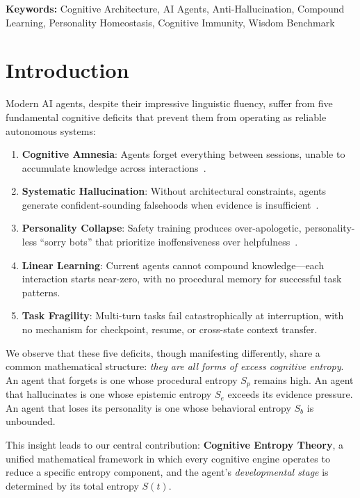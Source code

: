 \documentclass[11pt,a4paper]{article}
\begin{document}
\textbf{Keywords:} Cognitive Architecture, AI Agents, Anti-Hallucination,
Compound Learning, Personality Homeostasis, Cognitive Immunity, Wisdom Benchmark

\section{Introduction}

Modern AI agents, despite their impressive linguistic fluency, suffer from
five fundamental cognitive deficits that prevent them from operating as
reliable autonomous systems:

\begin{enumerate}[nosep]
  \item \textbf{Cognitive Amnesia}: Agents forget everything between sessions,
    unable to accumulate knowledge across interactions~\cite{mem0,letta}.
  \item \textbf{Systematic Hallucination}: Without architectural constraints,
    agents generate confident-sounding falsehoods when evidence is
    insufficient~\cite{truthfulqa}.
  \item \textbf{Personality Collapse}: Safety training produces
    over-apologetic, personality-less ``sorry bots'' that prioritize
    inoffensiveness over helpfulness~\cite{guardrails}.
  \item \textbf{Linear Learning}: Current agents cannot compound knowledge---each
    interaction starts near-zero, with no procedural memory for successful
    task patterns.
  \item \textbf{Task Fragility}: Multi-turn tasks fail catastrophically at
    interruption, with no mechanism for checkpoint, resume, or cross-state
    context transfer.
\end{enumerate}

We observe that these five deficits, though manifesting differently, share
a common mathematical structure: \emph{they are all forms of excess
cognitive entropy}. An agent that forgets is one whose procedural entropy
$S_p$ remains high. An agent that hallucinates is one whose epistemic
entropy $S_e$ exceeds its evidence pressure. An agent that loses its
personality is one whose behavioral entropy $S_b$ is unbounded.

This insight leads to our central contribution: \textbf{Cognitive Entropy
Theory}, a unified mathematical framework in which every cognitive engine
operates to reduce a specific entropy component, and the agent's
\emph{developmental stage} is determined by its total entropy $S(t)$.
\end{document}
